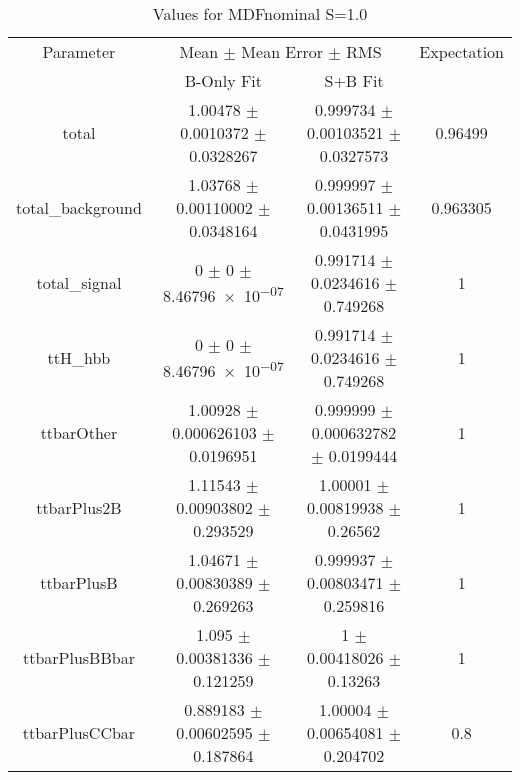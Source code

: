 \begin{table}
\centering
\caption{Values for MDFnominal S=1.0}
\begin{tabular}{cccc}
\toprule
Parameter & \multicolumn{2}{c}{Mean $\pm$ Mean Error $\pm$ RMS} & Expectation\\
 & B-Only Fit & S+B Fit & \\
\midrule
total & \num{1.00478} $\pm$ \num{0.0010372} $\pm$ \num{0.0328267} & \num{0.999734} $\pm$ \num{0.00103521} $\pm$ \num{0.0327573} & \num{0.96499}\\
total\_background & \num{1.03768} $\pm$ \num{0.00110002} $\pm$ \num{0.0348164} & \num{0.999997} $\pm$ \num{0.00136511} $\pm$ \num{0.0431995} & \num{0.963305}\\
total\_signal & \num{0} $\pm$ \num{0} $\pm$ \num{8.46796e-07} & \num{0.991714} $\pm$ \num{0.0234616} $\pm$ \num{0.749268} & \num{1}\\
ttH\_hbb & \num{0} $\pm$ \num{0} $\pm$ \num{8.46796e-07} & \num{0.991714} $\pm$ \num{0.0234616} $\pm$ \num{0.749268} & \num{1}\\
ttbarOther & \num{1.00928} $\pm$ \num{0.000626103} $\pm$ \num{0.0196951} & \num{0.999999} $\pm$ \num{0.000632782} $\pm$ \num{0.0199444} & \num{1}\\
ttbarPlus2B & \num{1.11543} $\pm$ \num{0.00903802} $\pm$ \num{0.293529} & \num{1.00001} $\pm$ \num{0.00819938} $\pm$ \num{0.26562} & \num{1}\\
ttbarPlusB & \num{1.04671} $\pm$ \num{0.00830389} $\pm$ \num{0.269263} & \num{0.999937} $\pm$ \num{0.00803471} $\pm$ \num{0.259816} & \num{1}\\
ttbarPlusBBbar & \num{1.095} $\pm$ \num{0.00381336} $\pm$ \num{0.121259} & \num{1} $\pm$ \num{0.00418026} $\pm$ \num{0.13263} & \num{1}\\
ttbarPlusCCbar & \num{0.889183} $\pm$ \num{0.00602595} $\pm$ \num{0.187864} & \num{1.00004} $\pm$ \num{0.00654081} $\pm$ \num{0.204702} & \num{0.8}\\
\bottomrule
\end{tabular}
\end{table}